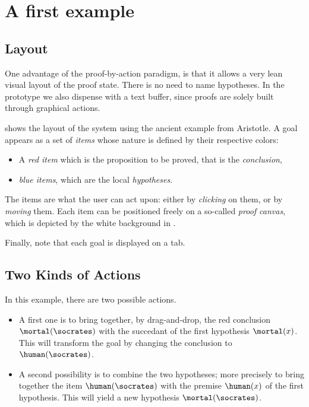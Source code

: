 
\section{A first example}

\subsection{Layout}
One advantage of the proof-by-action paradigm, is that it allows a very lean
visual layout of the proof state. There is no need to name hypotheses. In the
prototype we also dispense with a text buffer, since proofs are solely built
through graphical actions.


 shows the layout of the system using the
ancient example from Aristotle. A goal appears as a set of {\em items}
whose nature is defined by their respective colors:
\begin{itemize}
\item A {\em red item} which is the proposition to be proved, that is the
 {\em conclusion},
\item {\em blue items}, which are the local {\em hypotheses}.
\end{itemize}

The items are what the user can act upon: either by {\em clicking} on them, or
by {\em moving} them. Each item can be positioned freely on a so-called
\emph{proof canvas}, which is depicted by the white background in
.

Finally, note that each goal is displayed on a tab.

\subsection{Two Kinds of Actions}
In this example, there are two possible actions.

\begin{itemize}
\item A first one is to bring together, by drag-and-drop, the red conclusion
$\mortal(\socrates)$ with the succedant of the first hypothesis $\mortal(x)$.
This will transform the goal by changing the conclusion to $\human(\socrates)$.
\item A second possibility is to combine the two hypotheses; more precisely to
bring together the item $\human(\socrates)$ with the premise $\human(x)$ of the
first hypothesis. This will yield a new hypothesis $\mortal(\socrates)$.
\end{itemize}

